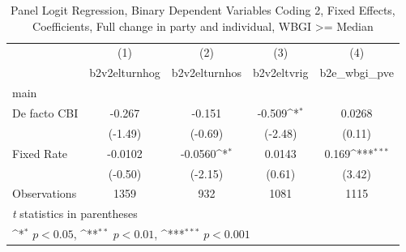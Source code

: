 \begin{table}[htbp]\centering
\def\sym#1{\ifmmode^{#1}\else\(^{#1}\)\fi}
\caption{Panel Logit Regression, Binary Dependent Variables Coding 2, Fixed Effects, Coefficients, Full change in party and individual, WBGI >= Median \label{logitFEMultInd2DF}}
\begin{tabular}{l*{4}{c}}
\toprule
                                        &\multicolumn{1}{c}{(1)}&\multicolumn{1}{c}{(2)}&\multicolumn{1}{c}{(3)}&\multicolumn{1}{c}{(4)}\\
                                        &\multicolumn{1}{c}{b2v2elturnhog}&\multicolumn{1}{c}{b2v2elturnhos}&\multicolumn{1}{c}{b2v2eltvrig}&\multicolumn{1}{c}{b2e\_wbgi\_pve}\\
\midrule
main                                    &                  &                  &                  &                  \\
De facto CBI                            &   -0.267         &   -0.151         &   -0.509\sym{*}  &   0.0268         \\
                                        &  (-1.49)         &  (-0.69)         &  (-2.48)         &   (0.11)         \\
\addlinespace
Fixed Rate                              &  -0.0102         &  -0.0560\sym{*}  &   0.0143         &    0.169\sym{***}\\
                                        &  (-0.50)         &  (-2.15)         &   (0.61)         &   (3.42)         \\
\midrule
Observations                            &     1359         &      932         &     1081         &     1115         \\
\bottomrule
\multicolumn{5}{l}{\footnotesize \textit{t} statistics in parentheses}\\
\multicolumn{5}{l}{\footnotesize \sym{*} \(p<0.05\), \sym{**} \(p<0.01\), \sym{***} \(p<0.001\)}\\
\end{tabular}
\end{table}
